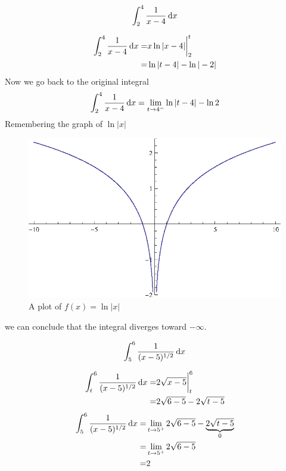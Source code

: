 \begin{ex}
  \[ \int^4_2 \frac{1}{x-4}\,\mathrm{d} x \]
  \begin{sol}
    \begin{align*}
      \int^4_2 \frac{1}{x-4}\,\mathrm{d} x
      =& x\ln{|x-4|}\bigg|^t_2 \\
      =& \ln{|t-4|}-\ln{|-2|}
    \end{align*}
    Now we go back to the original integral
    \[
      \int^4_2 \frac{1}{x-4}\,\mathrm{d} x
      = \lim_{t \to 4^-}\ln{|t-4|}-\ln 2
      \]
      Remembering the graph of \(\ln{|x|}\)
      \begin{figure}[H]
        \begin{center}
          \includegraphics[scale=1]{graphs/logabsx.eps}
        \end{center}
        \caption{A plot of \(f(x)=\ln{|x|}\)}
      \end{figure}
      we can conclude that the integral diverges toward $-\infty$.
  \end{sol}
\end{ex}
\begin{ex}
  \[ \int^6_5 \frac{1}{(x-5)^{1/2}}\,\mathrm{d} x \]
  \begin{sol}
    \begin{align*}
      \int^6_t \frac{1}{(x-5)^{1/2}}\,\mathrm{d} x
      =& 2 \sqrt{x-5}\bigg|^6_t \\
      =& 2 \sqrt{6-5}-2\sqrt{t-5}
    \end{align*}
    \begin{align*}
      \int^6_5 \frac{1}{(x-5)^{1/2}}\,\mathrm{d} x
      =& \lim_{t \to 5^+} 2\sqrt{6-5}-\underbrace{2\sqrt{t-5}}_{0} \\
      =& \lim_{t \to 5^+} 2\sqrt{6-5}\\
      =& 2
    \end{align*}
  \end{sol}
\end{ex}
